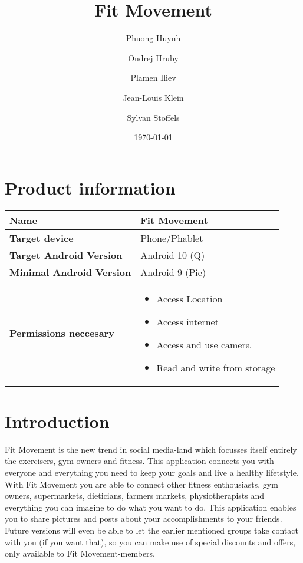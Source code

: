 \documentclass{article}
\title{\textbf{Fit Movement}}
\date{\today}
\author{Phuong Huynh \and Ondrej Hruby \and Plamen Iliev \and Jean-Louis Klein \and Sylvan Stoffels}
\begin{document}
\maketitle
\section*{Product information}

\begin{table}[H]
    \centering
    \begin{tabular}{|l|l|}
    \hline
    \textbf{Name} & Fit Movement \\ \hline
    \textbf{Target device} & Phone/Phablet \\ \hline
    \textbf{Target Android Version} & Android 10 (Q) \\ \hline
    \textbf{Minimal Android Version} & Android 9 (Pie) \\ \hline
    \textbf{Permissions neccesary} & \begin{minipage}[t]{0.5\textwidth}
                                        \begin{itemize}
                                            \item Access Location
                                            \item Access internet
                                            \item Access and use camera
                                            \item Read and write from storage
                                        \end{itemize} 
                                     \end{minipage} \\ \hline
    \end{tabular}
\end{table}
\section*{Introduction}
Fit Movement is the new trend in social media-land which focusses itself entirely the exercisers, gym owners and fitness. This application connects you with everyone and everything you need to keep your goals and live a healthy lifetstyle. With Fit Movement you are able to connect other fitness enthousiasts, gym owners, supermarkets, dieticians, farmers markets, physiotherapists and everything you can imagine to do what you want to do. This application enables you to share pictures and posts about your accomplishments to your friends. 
Future versions will even be able to let the earlier mentioned groups take contact with you (if you want that), so you can make use of special discounts and offers, only available to Fit Movement-members.
\end{document}
